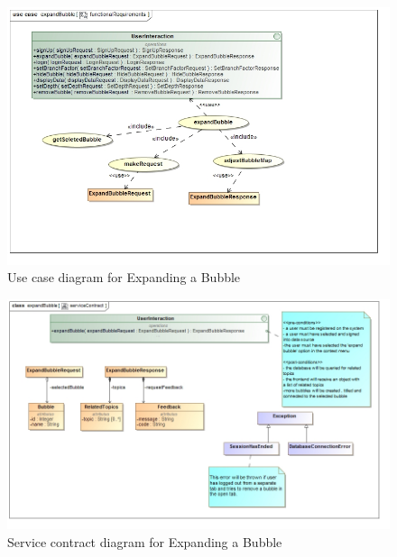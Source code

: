 \documentclass[hidelinks,english]{article}
\begin{document}
			    \begin{figure}[!h]
    			\includegraphics[width=\linewidth]{functionalRequirementsExpandBubble.jpg}
    			\caption{Use case diagram for Expanding a Bubble}
    			\label{UseCaseExpandBubble}
    			\end{figure}
    			
    			\begin{figure}[!h]
    			\includegraphics[width=\linewidth]{serviceContractExpandBubble.jpg}
    			\caption{Service contract diagram for Expanding a Bubble}
    			\label{ServiceContractExpandBubble}
    			\end{figure}
			    
\end{document}
